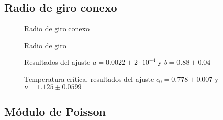 \subsection{Radio de giro conexo}
\begin{figure}[h]
  \centering
  
  \caption{Radio de giro conexo}
\end{figure}

\begin{figure}[h]
  \centering
  
  \caption{Radio de giro}
\end{figure}

\begin{figure}[h]
  \centering
  
  \caption{Resultados del ajuste $a=0.0022\pm 2\cdot 10^{-4}$ y $b=0.88\pm 0.04$ }
\end{figure}

\begin{figure}[h]
  \centering
  
  \caption{Temperatura crítica, resultados del ajuste $c_0=0.778\pm 0.007$ y $\nu=1.125\pm 0.0599$ }
\end{figure}
\clearpage
\subsection{Módulo de Poisson}

